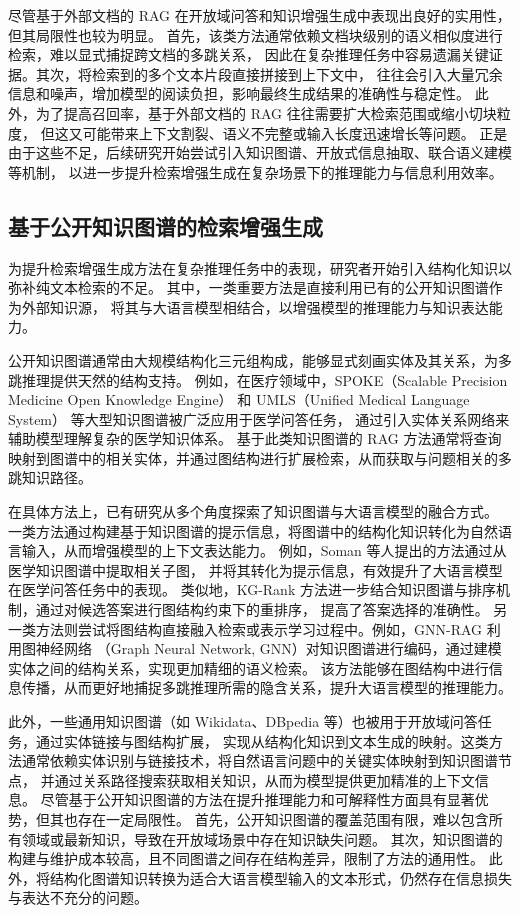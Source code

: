 尽管基于外部文档的 RAG 在开放域问答和知识增强生成中表现出良好的实用性，但其局限性也较为明显。
首先，该类方法通常依赖文档块级别的语义相似度进行检索，难以显式捕捉跨文档的多跳关系，
因此在复杂推理任务中容易遗漏关键证据。其次，将检索到的多个文本片段直接拼接到上下文中，
往往会引入大量冗余信息和噪声，增加模型的阅读负担，影响最终生成结果的准确性与稳定性。
此外，为了提高召回率，基于外部文档的 RAG 往往需要扩大检索范围或缩小切块粒度，
但这又可能带来上下文割裂、语义不完整或输入长度迅速增长等问题。
正是由于这些不足，后续研究开始尝试引入知识图谱、开放式信息抽取、联合语义建模等机制，
以进一步提升检索增强生成在复杂场景下的推理能力与信息利用效率。

\subsection{基于公开知识图谱的检索增强生成}

为提升检索增强生成方法在复杂推理任务中的表现，研究者开始引入结构化知识以弥补纯文本检索的不足。
其中，一类重要方法是直接利用已有的公开知识图谱作为外部知识源，
将其与大语言模型相结合，以增强模型的推理能力与知识表达能力。

公开知识图谱通常由大规模结构化三元组构成，能够显式刻画实体及其关系，为多跳推理提供天然的结构支持。
例如，在医疗领域中，SPOKE（Scalable Precision Medicine Open Knowledge Engine）\cite{spoke} 和 UMLS（Unified Medical Language System）\cite{umls} 等大型知识图谱被广泛应用于医学问答任务，
通过引入实体关系网络来辅助模型理解复杂的医学知识体系。
基于此类知识图谱的 RAG 方法通常将查询映射到图谱中的相关实体，并通过图结构进行扩展检索，从而获取与问题相关的多跳知识路径。

在具体方法上，已有研究从多个角度探索了知识图谱与大语言模型的融合方式。
一类方法通过构建基于知识图谱的提示信息，将图谱中的结构化知识转化为自然语言输入，从而增强模型的上下文表达能力。
例如，Soman\cite{soman2024biomedical} 等人提出的方法通过从医学知识图谱中提取相关子图，
并将其转化为提示信息，有效提升了大语言模型在医学问答任务中的表现。
类似地，KG-Rank\cite{yang2024kg} 方法进一步结合知识图谱与排序机制，通过对候选答案进行图结构约束下的重排序，
提高了答案选择的准确性。
另一类方法则尝试将图结构直接融入检索或表示学习过程中。例如，GNN-RAG\cite{mavromatis2025gnn} 利用图神经网络
（Graph Neural Network, GNN）\cite{he2021improving,mavromatis2022rearev}对知识图谱进行编码，通过建模实体之间的结构关系，实现更加精细的语义检索。
该方法能够在图结构中进行信息传播，从而更好地捕捉多跳推理所需的隐含关系，提升大语言模型的推理能力。

此外，一些通用知识图谱（如 Wikidata\cite{vrandevcic2014wikidata}、DBpedia\cite{auer2007dbpedia} 等）也被用于开放域问答任务，通过实体链接与图结构扩展，
实现从结构化知识到文本生成的映射。这类方法通常依赖实体识别与链接技术，将自然语言问题中的关键实体映射到知识图谱节点，
并通过关系路径搜索获取相关知识，从而为模型提供更加精准的上下文信息。
尽管基于公开知识图谱的方法在提升推理能力和可解释性方面具有显著优势，但其也存在一定局限性。
首先，公开知识图谱的覆盖范围有限，难以包含所有领域或最新知识，导致在开放域场景中存在知识缺失问题。
其次，知识图谱的构建与维护成本较高，且不同图谱之间存在结构差异，限制了方法的通用性。
此外，将结构化图谱知识转换为适合大语言模型输入的文本形式，仍然存在信息损失与表达不充分的问题。


